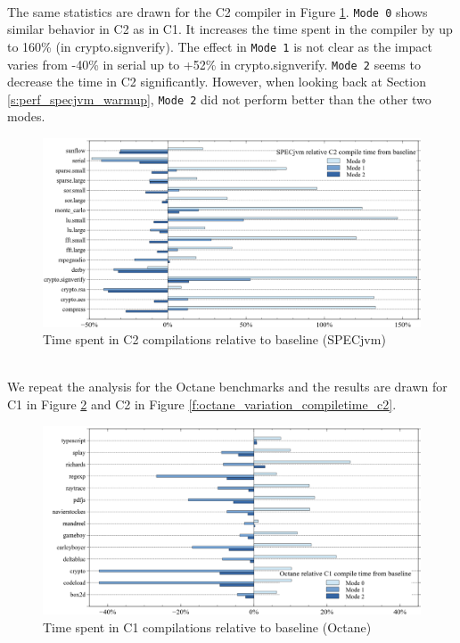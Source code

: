 \\
The same statistics are drawn for the C2 compiler in Figure \ref{f:all_variation_compiletime_c2}. 
\texttt{Mode 0} shows similar behavior in C2 as in C1. It increases the time spent in the compiler by up to 160\% (in crypto.signverify).
The effect in \texttt{Mode 1} is not clear as the impact varies from -40\% in serial up to +52\% in crypto.signverify. \texttt{Mode 2} seems to decrease the time in C2 significantly. However, when looking back at Section \ref{s:perf_specjvm_warmup}, \texttt{Mode 2} did not perform better than the other two modes.
\begin{figure}[ht!]
  \begin{center}
    \centering
    \includegraphics[width=1.0\textwidth]{figures/all_variation_compiletime_c2.png}
    \caption{Time spent in C2 compilations relative to baseline (SPECjvm)}
    \label{f:all_variation_compiletime_c2}
  \end{center}
\end{figure}
\\
We repeat the analysis for the Octane benchmarks and the results are drawn for C1 in Figure \ref{f:octane_variation_compiletime_c1} and C2 in Figure \ref{f:octane_variation_compiletime_c2}.
\begin{figure}[ht]
  \begin{center}
    \centering
    \includegraphics[width=1.0\textwidth]{figures/octane_variation_compiletime_c1.png}
    \caption{Time spent in C1 compilations relative to baseline (Octane)}
    \label{f:octane_variation_compiletime_c1}
  \end{center}
\end{figure}
